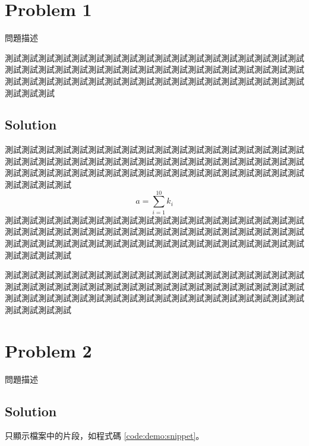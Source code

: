 \documentclass[12pt, a4paper]{article}
\begin{document}
\cfoot{\thepage}

\tableofcontents\thispagestyle{fancy}


\section{Problem 1}

問題描述

測試測試測試測試測試測試測試測試測試測試測試測試測試測試測試測試測試測試測試測試測試測試測試測試測試測試測試測試測試測試測試測試測試測試測試測試測試測試測試測試測試測試測試測試測試測試測試測試測試測試測試測試測試測試測試測試測試

\subsection*{Solution}

測試測試測試測試測試測試測試測試測試測試測試測試測試測試測試測試測試測試測試測試測試測試測試測試測試測試測試測試測試測試測試測試測試測試測試測試測試測試測試測試測試測試測試測試測試測試測試測試測試測試測試測試測試測試測試測試測試測試
\begin{equation*}
    a = \sum_{i=1}^{10} k_i
\end{equation*}
測試測試測試測試測試測試測試測試測試測試測試測試測試測試測試測試測試測試測試測試測試測試測試測試測試測試測試測試測試測試測試測試測試測試測試測試測試測試測試測試測試測試測試測試測試測試測試測試測試測試測試測試測試測試測試測試測試測試

測試測試測試測試測試測試測試測試測試測試測試測試測試測試測試測試測試測試測試測試測試測試測試測試測試測試測試測試測試測試測試測試測試測試測試測試測試測試測試測試測試測試測試測試測試測試測試測試測試測試測試測試測試測試測試測試測試測試

\clearpage
\section{Problem 2}

問題描述

\subsection*{Solution}

只顯示檔案中的片段，如程式碼 \ref{code:demo:snippet}。
\end{document}
